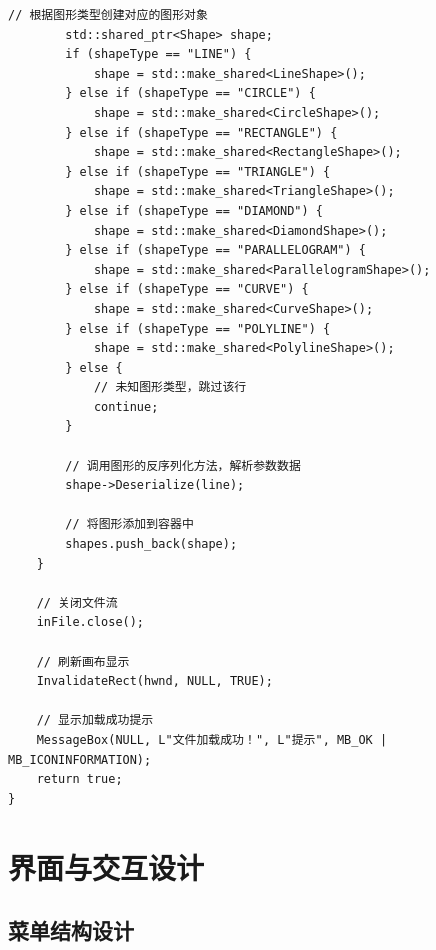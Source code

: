 \documentclass[12pt,a4paper]{article}
\begin{document}
\begin{lstlisting}[caption=文件读取与保存函数实现]
        // 根据图形类型创建对应的图形对象
        std::shared_ptr<Shape> shape;
        if (shapeType == "LINE") {
            shape = std::make_shared<LineShape>();
        } else if (shapeType == "CIRCLE") {
            shape = std::make_shared<CircleShape>();
        } else if (shapeType == "RECTANGLE") {
            shape = std::make_shared<RectangleShape>();
        } else if (shapeType == "TRIANGLE") {
            shape = std::make_shared<TriangleShape>();
        } else if (shapeType == "DIAMOND") {
            shape = std::make_shared<DiamondShape>();
        } else if (shapeType == "PARALLELOGRAM") {
            shape = std::make_shared<ParallelogramShape>();
        } else if (shapeType == "CURVE") {
            shape = std::make_shared<CurveShape>();
        } else if (shapeType == "POLYLINE") {
            shape = std::make_shared<PolylineShape>();
        } else {
            // 未知图形类型，跳过该行
            continue;
        }
        
        // 调用图形的反序列化方法，解析参数数据
        shape->Deserialize(line);
        
        // 将图形添加到容器中
        shapes.push_back(shape);
    }
    
    // 关闭文件流
    inFile.close();
    
    // 刷新画布显示
    InvalidateRect(hwnd, NULL, TRUE);
    
    // 显示加载成功提示
    MessageBox(NULL, L"文件加载成功！", L"提示", MB_OK | MB_ICONINFORMATION);
    return true;
}
\end{lstlisting}

\section{界面与交互设计}

\subsection{菜单结构设计}
\end{document}
